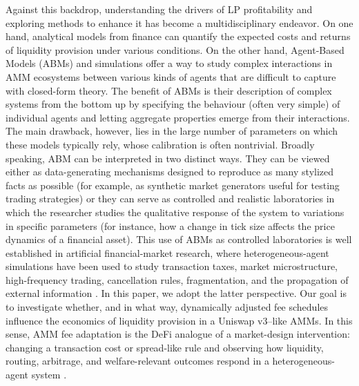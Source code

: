 \documentclass[11pt]{article}
\begin{document}
Against this backdrop, understanding the drivers of LP profitability and exploring methods to enhance it has become a 
multidisciplinary endeavor. On one hand, analytical models from finance can quantify the expected costs and returns of 
liquidity provision under various conditions. On the other hand, Agent-Based Models (ABMs) and simulations offer a way 
to study complex interactions in AMM ecosystems between various kinds of agents that are difficult to capture with 
closed-form theory. The benefit of ABMs is their description of complex systems from the bottom up by specifying the 
behaviour (often very simple) of individual agents and letting aggregate properties emerge from their interactions. 
The main drawback, however, lies in the large number of parameters on which these models typically rely, whose 
calibration is often nontrivial. Broadly speaking, ABM can be interpreted in two distinct ways. They can be viewed 
either as data-generating mechanisms designed to reproduce as many stylized facts as possible (for example, as 
synthetic market generators useful for testing trading strategies) or they can serve as controlled and realistic 
laboratories in which the researcher studies the qualitative response of the system to variations in specific 
parameters (for instance, how a change in tick size affects the price dynamics of a financial asset). This use of ABMs
as controlled laboratories is well established in artificial financial-market research, where heterogeneous-agent simulations
have been used to study transaction taxes, market microstructure, high-frequency trading, cancellation rules, fragmentation,
and the propagation of external information \cite{raberto2001,chakraborti2011,westerhoff2006,mannaro2008,pellizzari2009,leal2016,carro2015,mizuta2020}.
In this paper, we adopt the latter perspective. Our goal is to investigate whether, and in what way, dynamically adjusted fee schedules
influence the economics of liquidity provision in a Uniswap v3–like AMMs. In this sense, AMM fee adaptation is the DeFi analogue
of a market-design intervention: changing a transaction cost or spread-like rule and observing how liquidity, routing, arbitrage,
and welfare-relevant outcomes respond in a heterogeneous-agent system \cite{westerhoff2006,mannaro2008,pellizzari2009,mizuta2020}.
\end{document}
